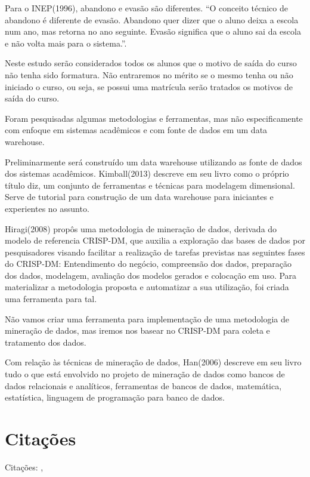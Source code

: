 Para o INEP(1996)\cite{InstitutoNacionaldeEstudosePesquisasEducacionaisInep1996InformeEscolar}, abandono e evasão são diferentes. “O conceito técnico de abandono é diferente de evasão. Abandono quer dizer que o aluno deixa a escola num ano, mas retorna no ano seguinte. Evasão significa que o aluno sai da escola e não volta mais para o sistema.”.

Neste estudo serão considerados todos os alunos que o motivo de saída do curso não tenha sido formatura. Não entraremos no mérito se o mesmo tenha ou não iniciado o curso, ou seja, se possui uma matrícula serão tratados os motivos de saída do curso.

Foram pesquisadas algumas metodologias e ferramentas,  mas não especificamente com enfoque em sistemas acadêmicos e com fonte de dados em um data warehouse. 

Preliminarmente será construído um data warehouse utilizando as fonte de dados dos sistemas acadêmicos. Kimball(2013) descreve em seu livro como o próprio título diz, um conjunto de  ferramentas e técnicas para modelagem dimensional. Serve de tutorial para construção de um data warehouse para iniciantes e experientes no assunto.

Hiragi(2008) propôs uma metodologia de mineração de dados, derivada do modelo de referencia CRISP-DM, que auxilia a exploração das bases de dados por pesquisadores visando facilitar a realização de tarefas previstas  nas seguintes fases do CRISP-DM: Entendimento do negócio, compreensão dos dados, preparação dos dados, modelagem, avaliação dos modelos gerados e colocação em uso.  Para materializar  a metodologia proposta e automatizar a sua utilização, foi criada uma ferramenta para tal.

Não vamos criar uma ferramenta para implementação de uma metodologia de mineração de dados, mas iremos nos basear no CRISP-DM para coleta e tratamento dos dados.

Com relação às técnicas de mineração de dados, Han(2006) descreve em seu livro  tudo o que está envolvido no projeto de mineração de dados como bancos de dados relacionais e analíticos, ferramentas de bancos de dados, matemática, estatística, linguagem de programação para banco de dados.











\section{Citações}%
   Citações: 
   \cite{Gilioli2016EVASAOGilioli},%
   \cite{Catani2006PROUNI:Superior}
   \cite{Andriola2006OpinioesUFC}
   \cite{Beatriz2007ABrasileiro}
   \cite{Lobo2012PanoramaSolucoes}
   \cite{Nassar2011Do.}
   \cite{Pereira2003DeterminantesPara}
   \cite{Silva2014EvasaoTransacao}
   \cite{Veneroso2016AsFederal}
   \cite{Vitelli2010EvasaoFenomeno}
   \cite{Pereira2011EvasaoGrosso}

  

